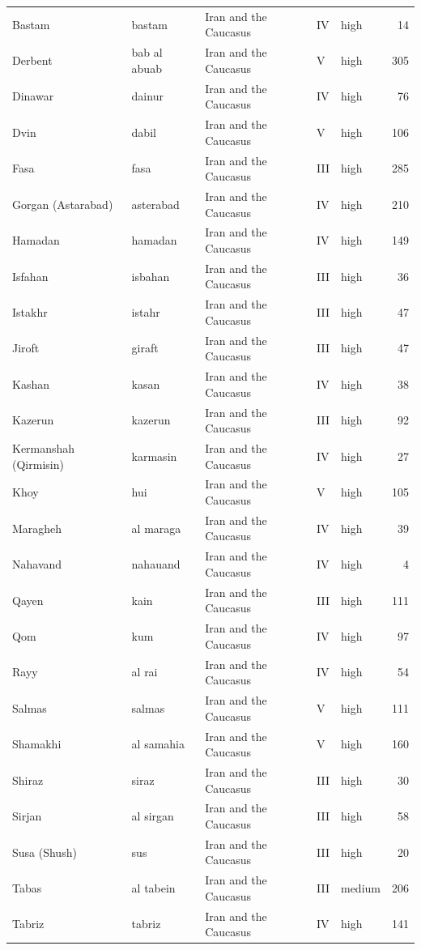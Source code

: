 \documentclass[11pt,a4paper]{article}
\begin{document}
{\begin{longtable}{p{4.6cm}p{3.0cm}p{3.6cm}llr}
Bastam & bastam & Iran and the Caucasus & IV & high & 14\\
Derbent & bab al abuab & Iran and the Caucasus & V & high & 305\\
Dinawar & dainur & Iran and the Caucasus & IV & high & 76\\
Dvin & dabil & Iran and the Caucasus & V & high & 106\\
Fasa & fasa & Iran and the Caucasus & III & high & 285\\
Gorgan (Astarabad) & asterabad & Iran and the Caucasus & IV & high & 210\\
Hamadan & hamadan & Iran and the Caucasus & IV & high & 149\\
Isfahan & isbahan & Iran and the Caucasus & III & high & 36\\
Istakhr & istahr & Iran and the Caucasus & III & high & 47\\
Jiroft & giraft & Iran and the Caucasus & III & high & 47\\
Kashan & kasan & Iran and the Caucasus & IV & high & 38\\
Kazerun & kazerun & Iran and the Caucasus & III & high & 92\\
Kermanshah (Qirmisin) & karmasin & Iran and the Caucasus & IV & high & 27\\
Khoy & hui & Iran and the Caucasus & V & high & 105\\
Maragheh & al maraga & Iran and the Caucasus & IV & high & 39\\
Nahavand & nahauand & Iran and the Caucasus & IV & high & 4\\
Qayen & kain & Iran and the Caucasus & III & high & 111\\
Qom & kum & Iran and the Caucasus & IV & high & 97\\
Rayy & al rai & Iran and the Caucasus & IV & high & 54\\
Salmas & salmas & Iran and the Caucasus & V & high & 111\\
Shamakhi & al samahia & Iran and the Caucasus & V & high & 160\\
Shiraz & siraz & Iran and the Caucasus & III & high & 30\\
Sirjan & al sirgan & Iran and the Caucasus & III & high & 58\\
Susa (Shush) & sus & Iran and the Caucasus & III & high & 20\\
Tabas & al tabein & Iran and the Caucasus & III & medium & 206\\
Tabriz & tabriz & Iran and the Caucasus & IV & high & 141\\

\end{longtable}}
\end{document}
